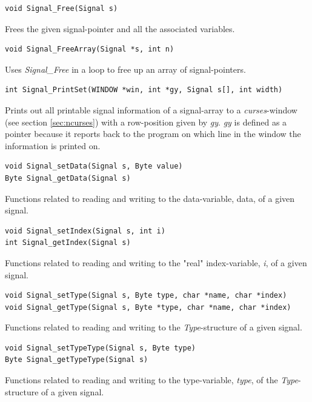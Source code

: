 \documentclass[main.tex]{subfiles}
\begin{document}
\begin{lstlisting}[frame=single] 
void Signal_Free(Signal s)
\end{lstlisting}
Frees the given signal-pointer and all the associated variables.\\

\begin{lstlisting}[frame=single] 
void Signal_FreeArray(Signal *s, int n)
\end{lstlisting}
Uses \textit{Signal\_Free} in a loop to free up an array of signal-pointers.\\

\begin{lstlisting}[frame=single] 
int Signal_PrintSet(WINDOW *win, int *gy, Signal s[], int width)
\end{lstlisting}
Prints out all printable signal information of a signal-array to a \textit{curses}-window (see section \ref{sec:ncurses}) with a row-position given by \textit{gy}. \textit{gy} is defined as a pointer because it reports back to the program on which line in the window the information is printed on. \\

\begin{lstlisting}[frame=single] 
void Signal_setData(Signal s, Byte value)
Byte Signal_getData(Signal s)
\end{lstlisting}
Functions related to reading and writing to the data-variable, data, of a given signal.\\

\begin{lstlisting}[frame=single] 
void Signal_setIndex(Signal s, int i)
int Signal_getIndex(Signal s)
\end{lstlisting}
Functions related to reading and writing to the "real" index-variable, \textit{i}, of a given signal.\\

\begin{lstlisting}[frame=single] 
void Signal_setType(Signal s, Byte type, char *name, char *index)
void Signal_getType(Signal s, Byte *type, char *name, char *index)
\end{lstlisting}
Functions related to reading and writing to the \textit{Type}-structure of a given signal.\\

\begin{lstlisting}[frame=single] 
void Signal_setTypeType(Signal s, Byte type)
Byte Signal_getTypeType(Signal s)
\end{lstlisting}
Functions related to reading and writing to the type-variable, \textit{type}, of the \textit{Type}-structure of a given signal.\\
\end{document}
